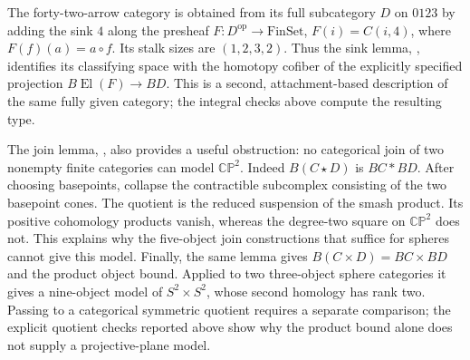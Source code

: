 \begin{remark*}
The forty-two-arrow category is obtained from its full subcategory
$D$ on $0123$ by adding the sink $4$ along the presheaf
$F:D^{\mathrm{op}}\to\mathrm{FinSet}$, $F(i)=C(i,4)$,
where $F(f)(a)=a\circ f$. Its stalk sizes are $(1,2,3,2)$.
Thus the sink lemma, \cite[Lemma~2.1]{CP2-Carcacia2026}, identifies
its classifying space with the homotopy cofiber of the explicitly
specified projection $B\operatorname{El}(F)\to BD$. This is a
second, attachment-based description of the same fully given
category; the integral checks above compute the resulting type.

The join lemma, \cite[Lemma~1.2]{CP2-Carcacia2026}, also provides
a useful obstruction: no categorical join of two nonempty finite
categories can model $\mathbb{CP}^2$. Indeed $B(C\star D)$ is
$BC*BD$. After choosing basepoints, collapse the contractible
subcomplex consisting of the two basepoint cones. The quotient
is the reduced suspension of the smash product. Its positive
cohomology products vanish, whereas the degree-two square on
$\mathbb{CP}^2$ does not. This explains why the five-object
join constructions that suffice for spheres cannot give this
model. Finally, the same lemma gives
$B(C\times D)=BC\times BD$ and the product object bound.
Applied to two three-object sphere categories it gives a
nine-object model of $S^2\times S^2$, whose second homology
has rank two. Passing to a categorical symmetric quotient
requires a separate comparison; the explicit quotient checks
reported above show why the product bound alone does not
supply a projective-plane model.
\end{remark*}

